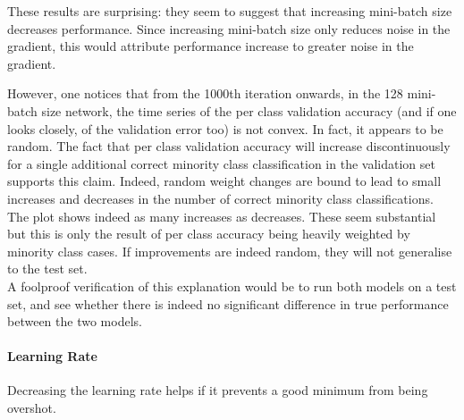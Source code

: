 \documentclass[a4paper,11pt]{article}
\begin{document}
These results are surprising: they seem to suggest that increasing mini-batch size decreases performance. Since increasing mini-batch size only reduces noise in the gradient, this would attribute performance increase to greater noise in the gradient. 

However, one notices that from the 1000th iteration onwards, in the 128 mini-batch size network, the time series of the per class validation accuracy (and if one looks closely, of the validation error too) is not convex. In fact, it appears to be random. The fact that per class validation accuracy will increase discontinuously for a single additional correct minority class classification in the validation set supports this claim. Indeed, random weight changes are bound to lead to small increases and decreases in the number of correct minority class classifications. The plot shows indeed as many increases as decreases. These seem substantial but this is only the result of per class accuracy being heavily weighted by minority class cases. If improvements are indeed random, they will not generalise to the test set. \\

A foolproof verification of this explanation would be to run both models on a test set, and see whether there is indeed no significant difference in true performance between the two models. \\	


\paragraph{Learning Rate}

Decreasing the learning rate helps if it prevents a good minimum from being overshot. 
\end{document}
